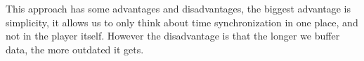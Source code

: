 This approach has some advantages and disadvantages, the biggest advantage is simplicity, it allows us to only think about time synchronization in one place, and not in the player itself.
However the disadvantage is that the longer we buffer data, the more outdated it gets.



